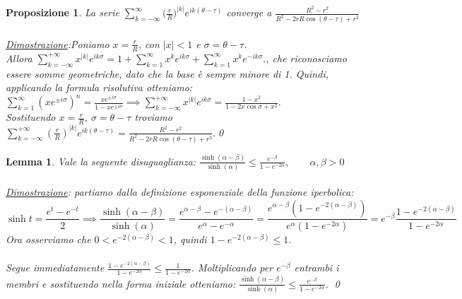 \documentclass[a4paper,12pt]{report}
\newtheorem{proposizione}{Proposizione}[chapter]
\newtheorem{lemma}{Lemma}[chapter]
\begin{document}
\begin{proposizione}\label{app: .7}
    La serie $\displaystyle\sum_{k=-\infty}^\infty\bigg(\frac{r}{R}\bigg)^{|k|}e^{ik(\theta-\tau)}$ converge a $\displaystyle\frac{R^2-r^2}{R^2-2rR\cos(\theta-\tau)+r^2}$
    \\
    \\\underline{Dimostrazione}:Poniamo \(x=\frac{r}{R}\), con \(|x|<1\) e $\sigma=\theta -\tau$. 
    \\Allora $\sum_{k=-\infty}^{+\infty} x^{|k|} e^{ik\sigma}
=
1+\sum_{k=1}^{\infty} x^k e^{ik\sigma}
+\sum_{k=1}^{\infty} x^k e^{-ik\sigma}.
$, che riconosciamo essere somme geometriche, dato che la base è sempre minore di 1. Quindi, applicando la formula risolutiva otteniamo: $\sum_{k=1}^{\infty} (x e^{\pm i\sigma})^n
=\frac{x e^{\pm i\sigma}}{1-x e^{\pm i\sigma}}\implies\sum_{k=-\infty}^{+\infty} x^{|k|} e^{ik\sigma}
=
\frac{1-x^2}{1-2x\cos\sigma+x^2}.
$
\\Sostituendo \(x=\frac{r}{R}\), \(\sigma=\theta-\tau\) troviamo $
\sum_{k=-\infty}^{+\infty}
\left(\frac{r}{R}\right)^{|k|} e^{ik(\theta-\tau)}
=
\frac{R^2-r^2}{R^2-2rR\cos(\theta-\tau)+r^2}.
$\qed
\end{proposizione}

\begin{lemma}\label{app: .5}
    Vale la seguente disuguaglianza:  $\frac{\sinh(\alpha-\beta)}{\sinh(\alpha)}
\le
\frac{e^{-\beta}}{1-e^{-2\alpha}},
\qquad
\alpha,\beta>0$
\\
\\ \underline{Dimostrazione}:
partiamo dalla definizione esponenziale della funzione iperbolica:
\[
\sinh t=\frac{e^t-e^{-t}}{2}\implies\frac{\sinh(\alpha-\beta)}{\sinh(\alpha)}
=
\frac{
e^{\alpha-\beta}-e^{-(\alpha-\beta)}
}{
e^\alpha-e^{-\alpha}
}=
\frac{
e^{\alpha-\beta}\left(1-e^{-2(\alpha-\beta)}\right)
}{
e^\alpha\left(1-e^{-2\alpha}\right)
}=
e^{-\beta}
\frac{
1-e^{-2(\alpha-\beta)}
}{
1-e^{-2\alpha}
}
\]
Ora osserviamo che $0<e^{-2(\alpha-\beta)}<1$, quindi $1-e^{-2(\alpha-\beta)}\le 1$.
\\
\\Segue immediatamente $\frac{
1-e^{-2(\alpha-\beta)}
}{
1-e^{-2\alpha}
}
\le
\frac{1}{1-e^{-2\alpha}}$. Moltiplicando per \(e^{-\beta}\) entrambi i membri e sostituendo nella forma iniziale otteniamo: $\frac{\sinh(\alpha-\beta)}{\sinh(\alpha)}
\le
\frac{e^{-\beta}}{1-e^{-2\alpha}}$. \qed
\end{lemma}
\end{document}
